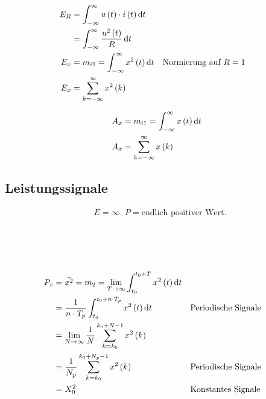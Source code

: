 \begin{boxleft}
\\
\end{boxleft}\begin{boxrightshaded}
\begin{align*}
E_R&=\int_{-\infty}^\infty u\left(t\right)\cdot i\left(t\right)\mathop{}\!\mathrm{d} t\\
&=\int_{-\infty}^\infty \frac{u^2\left(t\right)}{R}\mathop{}\!\mathrm{d} t\\
E_x&=m_{i2}=\int_{-\infty}^\infty x^2\left(t\right)\mathop{}\!\mathrm{d} t&&\text{Normierung auf $R=1$}\\
E_x&=\sum_{k=-\infty}^{\infty}x^2\left(k\right)
\end{align*}
\end{boxrightshaded}

\begin{boxleft}
\end{boxleft}\begin{boxrightshaded}
\begin{align*}
A_x&=m_{i1}=\int_{-\infty}^\infty x\left(t\right)\mathop{}\!\mathrm{d} t\\
A_x&=\sum_{k=-\infty}^{\infty}x\left(k\right)
\end{align*}
\end{boxrightshaded}


\subsection{Leistungssignale}


\begin{boxshaded}
\begin{align*}
&\text{$E=\infty$. $P=$endlich positiver Wert.} 
\end{align*}
\end{boxshaded}

\begin{boxleft}
\\
\\
\\
\end{boxleft}\begin{boxrightshaded}
\begin{align*}
P_x&=\bar{x^2}=m_2=\lim_{T\to \infty}\int_{t_0}^{t_0+T} x^2\left(t\right)\mathop{}\!\mathrm{d} t\\
&=\frac{1}{n\cdot T_p}\int_{t_0}^{t_0+n\cdot T_p} x^2\left(t\right)\mathop{}\!\mathrm{d} t&&\text{Periodische Signale}\\
&=\lim_{N\to \infty}\frac{1}{N}\sum_{k=k_0}^{k_0+N-1}x^2\left(k\right)\\
&=\frac{1}{N_p}\sum_{k=k_0}^{k_0+N_p-1}x^2\left(k\right)&&\text{Periodische Signale}\\
&=X_0^2&&\text{Konstantes Signale}
\end{align*}
\end{boxrightshaded}


